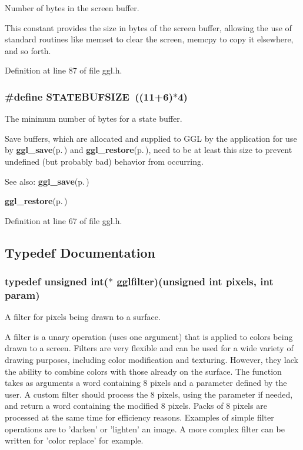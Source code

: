 Number of bytes in the screen buffer. 

This constant provides the size in bytes of the screen buffer, allowing the use of standard routines like memset to clear the screen, memcpy to copy it elsewhere, and so forth. 

Definition at line 87 of file ggl.h.
\subsubsection{\setlength{\rightskip}{0pt plus 5cm}\#define STATEBUFSIZE~((11+6)$\ast$4)}\label{ggl_8h_a0}


The minimum number of bytes for a state buffer. 

Save buffers, which are allocated and supplied to GGL by the application for use by {\bf ggl\_\-save}{\rm (p.\,\pageref{ggl_8h_a5})} and {\bf ggl\_\-restore}{\rm (p.\,\pageref{ggl_8h_a11})}, need to be at least this size to prevent undefined (but probably bad) behavior from occurring.

\begin{Desc}
\item[See also:]{\bf ggl\_\-save}{\rm (p.\,\pageref{ggl_8h_a5})} 

{\bf ggl\_\-restore}{\rm (p.\,\pageref{ggl_8h_a11})} \end{Desc}


Definition at line 67 of file ggl.h.

\subsection{Typedef Documentation}
\subsubsection{\setlength{\rightskip}{0pt plus 5cm}typedef unsigned int($\ast$ {\bf gglfilter})(unsigned int pixels, int param)}\label{ggl_8h_a7}


A filter for pixels being drawn to a surface. 

A filter is a unary operation (uses one argument) that is applied to colors being drawn to a screen. Filters are very flexible and can be used for a wide variety of drawing purposes, including color modification and texturing. However, they lack the ability to combine colors with those already on the surface. The function takes as arguments a word containing 8 pixels and a parameter defined by the user. A custom filter should process the 8 pixels, using the parameter if needed, and return a word containing the modified 8 pixels. Packs of 8 pixels are processed at the same time for efficiency reasons. Examples of simple filter operations are to 'darken' or 'lighten' an image. A more complex filter can be written for 'color replace' for example.

